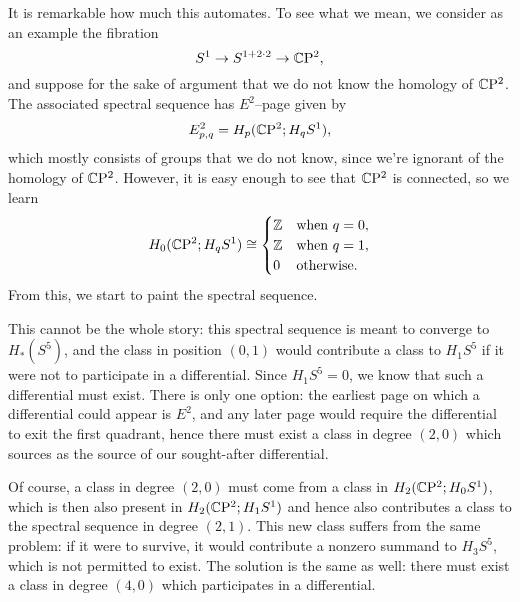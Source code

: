 \begin{example}\label{HomologicalCP2SSeq}
It is remarkable how much this automates.
To see what we mean, we consider as an example the fibration \[S^1 \to S^{1 + 2 \cdot 2} \to \mathbb C \mathrm{P}^2,\] and suppose for the sake of argument that we do not know the homology of $\mathbb C \mathrm{P}^2$.
The associated spectral sequence has $E^2$--page given by \[E^2_{p, q} = H_p(\mathbb C \mathrm{P}^2; H_q S^1),\] which mostly consists of groups that we do not know, since we're ignorant of the homology of $\mathbb C \mathrm{P}^2$.
However, it is easy enough to see that $\mathbb C \mathrm{P}^2$ is connected, so we learn \[H_0(\mathbb C \mathrm{P}^2; H_q S^1) \cong \begin{cases} \mathbb Z & \text{when $q = 0$}, \\ \mathbb Z & \text{when $q = 1$}, \\ 0 & \text{otherwise}. \end{cases}\]
From this, we start to paint the spectral sequence.

\noindent
This cannot be the whole story: this spectral sequence is meant to converge to $H_*(S^5)$, and the class in position $(0, 1)$ would contribute a class to $H_1 S^5$ if it were not to participate in a differential.
Since $H_1 S^5 = 0$, we know that such a differential must exist.
There is only one option: the earliest page on which a differential could appear is $E^2$, and any later page would require the differential to exit the first quadrant, hence there must exist a class in degree $(2, 0)$ which sources as the source of our sought-after differential.

Of course, a class in degree $(2, 0)$ must come from a class in $H_2(\mathbb C \mathrm{P}^2; H_0 S^1)$, which is then also present in $H_2(\mathbb C \mathrm{P}^2; H_1 S^1)$ and hence also contributes a class to the spectral sequence in degree $(2, 1)$.
This new class suffers from the same problem: if it were to survive, it would contribute a nonzero summand to $H_3 S^5$, which is not permitted to exist.
The solution is the same as well: there must exist a class in degree $(4, 0)$ which participates in a differential.


\end{example}
